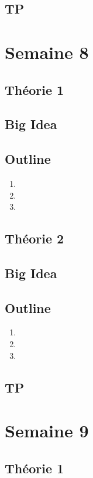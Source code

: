 \documentclass{article}
\begin{document}
\subsection{TP}

\pagebreak
\section{Semaine 8}
\subsection{Théorie 1}
\subsection*{Big Idea}
\subsection*{Outline}
    \begin{enumerate}
    \item
    \item
    \item
    \end{enumerate}
\subsection{Théorie 2}
\subsection*{Big Idea}
\subsection*{Outline}
    \begin{enumerate}
    \item
    \item
    \item
    \end{enumerate}
\subsection{TP}

\pagebreak
\section{Semaine 9}
\subsection{Théorie 1}
\end{document}
